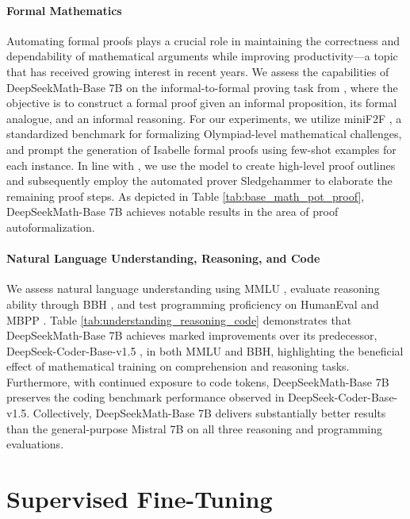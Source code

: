 \begin{itemize}[topsep=0pt]
\paragraph{Formal Mathematics}

Automating formal proofs plays a crucial role in maintaining the correctness and dependability of mathematical arguments while improving productivity—a topic that has received growing interest in recent years. We assess the capabilities of DeepSeekMath-Base 7B on the informal-to-formal proving task from \citep{dsp_proof}, where the objective is to construct a formal proof given an informal proposition, its formal analogue, and an informal reasoning. For our experiments, we utilize miniF2F \citep{minif2f}, a standardized benchmark for formalizing Olympiad-level mathematical challenges, and prompt the generation of Isabelle formal proofs using few-shot examples for each instance. In line with \cite{dsp_proof}, we use the model to create high-level proof outlines and subsequently employ the automated prover Sledgehammer \citep{sledgehammer} to elaborate the remaining proof steps. As depicted in Table \ref{tab:base_math_pot_proof}, DeepSeekMath-Base 7B achieves notable results in the area of proof autoformalization.

\paragraph{Natural Language Understanding, Reasoning, and Code}

We assess natural language understanding using MMLU \citep{mmlu}, evaluate reasoning ability through BBH \citep{bbh}, and test programming proficiency on HumanEval \citep{codex} and MBPP \citep{mbpp}. Table \ref{tab:understanding_reasoning_code} demonstrates that DeepSeekMath-Base 7B achieves marked improvements over its predecessor, DeepSeek-Coder-Base-v1.5 \citep{deepseek-coder}, in both MMLU and BBH, highlighting the beneficial effect of mathematical training on comprehension and reasoning tasks. Furthermore, with continued exposure to code tokens, DeepSeekMath-Base 7B preserves the coding benchmark performance observed in DeepSeek-Coder-Base-v1.5. Collectively, DeepSeekMath-Base 7B delivers substantially better results than the general-purpose Mistral 7B \citep{mistral} on all three reasoning and programming evaluations.

\section{Supervised Fine-Tuning}


\end{itemize}
